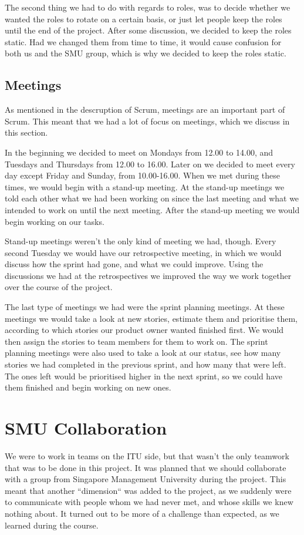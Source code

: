 The second thing we had to do with regards to roles, was to decide whether we wanted the roles to rotate on a certain basis, or just let people keep the roles until the end of the project. After some discussion, we decided to keep the roles static. Had we changed them from time to time, it would cause confusion for both us and the SMU group, which is why we decided to keep the roles static.

\subsection{Meetings}
\label{Collaboration_ITU_Meetings}
As mentioned in the descruption of Scrum, meetings are an important part of Scrum. This meant that we had a lot of focus on meetings, which we discuss in this section.

In the beginning we decided to meet on Mondays from 12.00 to 14.00, and Tuesdays and Thursdays from 12.00 to 16.00. Later on we decided to meet every day except Friday and Sunday, from 10.00-16.00. When we met during these times, we would begin with a stand-up meeting. At the stand-up meetings we told each other what we had been working on since the last meeting and what we intended to work on until the next meeting. After the stand-up meeting we would begin working on our tasks.

Stand-up meetings weren't the only kind of meeting we had, though. Every second Tuesday we would have our retrospective meeting, in which we would discuss how the sprint had gone, and what we could improve. Using the discussions we had at the retrospectives we improved the way we work together over the course of the project.

The last type of meetings we had were the sprint planning meetings. At these meetings we would take a look at new stories, estimate them and prioritise them, according to which stories our product owner wanted finished first. We would then assign the stories to team members for them to work on. The sprint planning meetings were also used to take a look at our status, see how many stories we had completed in the previous sprint, and how many that were left. The ones left would be prioritised higher in the next sprint, so we could have them finished and begin working on new ones.

\section{SMU Collaboration}
\label{Collaboration_SMU}
We were to work in teams on the ITU side, but that wasn't the only teamwork that was to be done in this project. It was planned that we should collaborate with a group from Singapore Management University during the project. This meant that another ``dimension`` was added to the project, as we suddenly were to communicate with people whom we had never met, and whose skills we knew nothing about. It turned out to be more of a challenge than expected, as we learned during the course.

